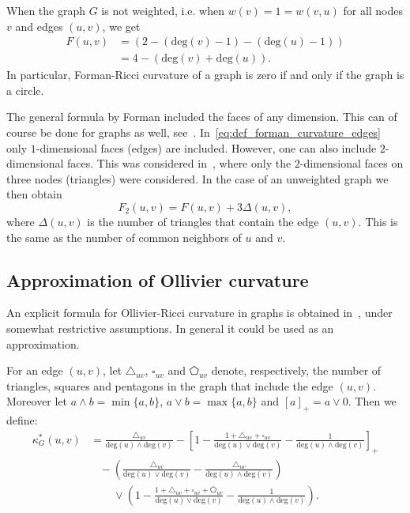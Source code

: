 \documentclass{article}
\begin{document}
When the graph $G$ is not weighted, i.e. when $w(v) = 1 = w(v,u)$ for all nodes $v$ and edges $(u,v)$, we get
\begin{align*}
	F(u,v) &= \left(2 - (\mathrm{deg}(v) - 1) - (\mathrm{deg}(u) - 1)\right) \\
	&= 4 - (\mathrm{deg}(v) + \mathrm{deg}(u)).
\end{align*}
In particular, Forman-Ricci curvature of a graph is zero if and only if the graph is a circle.

The general formula by Forman included the faces of any dimension. This can of course be done for graphs as well, see~\cite{weber2017coarse}. In~\eqref{eq:def_forman_curvature_edges} only $1$-dimensional faces (edges) are included. However, one can also include $2$-dimensional faces. This was considered in~\cite{samal2018comparative}, where only the $2$-dimensional faces on three nodes (triangles) were considered. In the case of an unweighted graph we then obtain
\begin{equation}\label{eq:def_forman_curvature_triangles}
	F_2(u,v) = F(u,v) + 3\Delta(u,v),
\end{equation}
where $\Delta(u,v)$ is the number of triangles that contain the edge $(u,v)$. This is the same as the number of common neighbors of $u$ and $v$. 

\subsection{Approximation of Ollivier curvature}

An explicit formula for Ollivier-Ricci curvature in graphs is obtained in~\cite{kelly2019self}, under somewhat restrictive assumptions. In general it could be used as an approximation.

For an edge $(u,v)$, let $\triangle_{uv}$, $\square_{uv}$ and $\pentagon_{uv}$ denote, respectively, the number of triangles, squares and pentagons in the graph that include the edge $(u,v)$. Moreover let $a \wedge b = \min\{a,b\}$, $a \vee b = \max\{a,b\}$ and $[a]_+ = a \vee 0$. Then we define:
\begin{equation}\label{eq:def_ollivier_ricci_approx}
	\begin{aligned}
		\kappa_G^\ast(u,v) &= \frac{\triangle_{uv}}{\mathrm{deg}(u) \wedge \mathrm{deg}(v)} 
			- \left[1 - \frac{1 + \triangle_{uv} + \square_{uv}}{\mathrm{deg}(u) \vee \mathrm{deg}(v)} - \frac{1}{\mathrm{deg}(u) \wedge \mathrm{deg}(v)}\right]_+\\
		&\hspace{10pt}- \left(\frac{\triangle_{uv}}{\mathrm{deg}(u) \vee \mathrm{deg}(v)} 
			- \frac{\triangle_{uv}}{\mathrm{deg}(u) \wedge \mathrm{deg}(v)}\right)\\
		&\hspace{25pt}\vee \left(1 - \frac{1 + \triangle_{uv} + \square_{uv} + \pentagon_{uv}}
			{\mathrm{deg}(u) \vee \mathrm{deg}(v)}
			- \frac{1}{\mathrm{deg}(u) \wedge \mathrm{deg}(v)}\right).
	\end{aligned}	
\end{equation}
\end{document}
